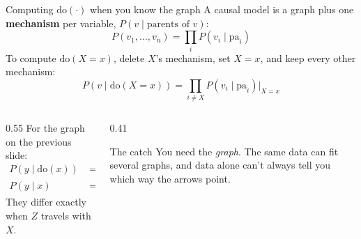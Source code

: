 \documentclass[aspectratio=169,11pt,xcolor={table}]{beamer}
\begin{document}
\begin{frame}{Computing $\mathrm{do}(\cdot)$ when you know the graph}
  A causal model is a graph plus one \textbf{mechanism} per variable, $P(v \mid \text{parents of } v)$:
  \[ P(v_1, \dots, v_n) = \prod_i P(v_i \mid \mathrm{pa}_i) \]
  To compute $\mathrm{do}(X = x)$, delete $X$'s mechanism, set $X = x$, and keep every other mechanism:
  \[ P(v \mid \mathrm{do}(X = x)) = \prod_{i \ne X} P(v_i \mid \mathrm{pa}_i) \Big|_{X = x} \]
  \vspace{-2mm}
  \begin{columns}[T]
    \begin{column}{0.55\textwidth}
      For the graph on the previous slide:
      \begin{align*}
        P(y \mid \mathrm{do}(x)) &= \textstyle\sum_z P(z)\, P(y \mid x, z)\\
        P(y \mid x)              &= \textstyle\sum_z P(z \mid x)\, P(y \mid x, z)
      \end{align*}
      They differ exactly when $Z$ travels with $X$.
    \end{column}
    \begin{column}{0.41\textwidth}
      \begin{block}{The catch}
        \small You need the \emph{graph}. The same data can fit several graphs,
        and data alone can't always tell you which way the arrows point.
      \end{block}
    \end{column}
  \end{columns}
\end{frame}
\end{document}
